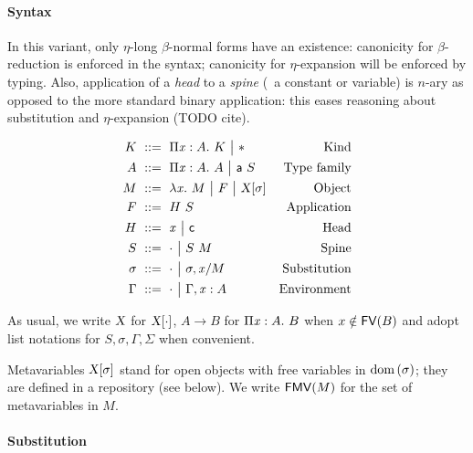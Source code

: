\documentclass[9pt]{sigplanconf}
\begin{document}
\paragraph{Syntax}

In this variant, only $\eta$-long $\beta$-normal forms have an
existence: canonicity for $\beta$-reduction is enforced in the syntax;
canonicity for $\eta$-expansion will be enforced by typing. Also,
application of a \emph{head} to a \emph{spine} (\ie\ a constant or
variable) is $n$-ary as opposed to the more standard binary
application: this eases reasoning about substitution and
$\eta$-expansion (TODO cite).

\begin{align*}
  K &\ ::=\ 
  \Pi{\ensuremath{\text{\textit{x}}}}:{A}.\  K \ {\big|}\ 
  \mathsf{*} &
  \text{Kind}\\
  A &\ ::=\ 
  \Pi{\ensuremath{\text{\textit{x}}}}:{A}.\  A \ {\big|}\ 
  {\text{\textsf{a}}}\  S &
  \text{Type family} \\
  M &\ ::=\ 
  \lambda{\ensuremath{\text{\textit{x}}}}.\  M \ {\big|}\ 
  F \ {\big|}\ 
  {\text{\textsl{X}}}[{\sigma}] &
  \text{Object} \\
  F &\ ::=\  {H}\  S &
  \text{Application} \\
  H &\ ::=\ 
  \text{\textit{x}} \ {\big|}\ 
  \text{\textsf{c}} &
  \text{Head}\\
  S &\ ::=\ 
  \cdot \ {\big|}\ 
  {S}\ {M} &
  \text{Spine}\\
  \sigma &\ ::=\ 
  \cdot \ {\big|}\ 
  {\sigma},{{\text{\textit{x}}}/{M}} &
  \text{Substitution} \\
  \Gamma &\ ::=\ 
  \cdot \ {\big|}\ 
  {\Gamma},{{\text{\textit{x}}}:{A}} &
  \text{Environment}
\end{align*}

As usual, we write $\text{\textsl{X}}$ for ${\text{\textsl{X}}}[{\cdot}]$, $A\to B$ for
$\Pi{\ensuremath{\text{\textit{x}}}}:{A}.\  B$ when $x\notin {\rm\mathsf{FV}}({B})$ and adopt list notations for $S,
\sigma, \Gamma, \Sigma$ when convenient.

Metavariables ${\text{\textsl{X}}}[{\sigma}]$ stand for open objects with free
variables in $\operatorname{dom}{(\sigma)}$; they are defined in a repository (see below). We
write ${\rm\mathsf{FMV}}({M})$ for the set of metavariables in $M$.

\paragraph{Substitution}
\end{document}
